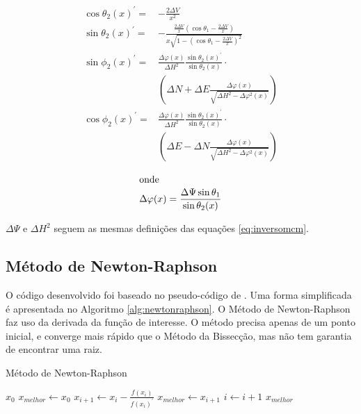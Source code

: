 \documentclass[final,5p]{elsarticle}
\numberwithin{equation}{section}
\begin{document}
    \begin{subequations}\label{eq:inversomcmprime}
    \begin{align}
        \cos \theta_2(x)^{\prime} =& - \frac{2 \Delta V}{x^2} \label{eq:costheta2prime} \\
        \sin \theta_2(x)^{\prime} =& - \frac{\frac{2 \Delta V}{x}(\cos \theta_1 - \frac{2 \Delta V}{x})}{x \sqrt{1-\left(\cos \theta_1 - \frac{2 \Delta V}{x} \right)^2}} \label{eq:sintheta2prime} \\
        \sin \phi_2(x)^{\prime} =& \frac{\Delta \varphi(x)}{\Delta H^2} \frac{\sin \theta_2(x)^{\prime}}{\sin \theta_2(x)} \cdot \nonumber \\
        &\left( \Delta N + \Delta E \frac{\Delta \varphi(x)}{\sqrt{\Delta H^2 - \Delta \varphi^2(x)}} \right) \label{eq:sinphi2prime} \\
        \cos \phi_2(x)^{\prime} =& \frac{\Delta \varphi(x)}{\Delta H^2} \frac{\sin \theta_2(x)^{\prime}}{\sin \theta_2(x)} \cdot \nonumber \\
        &\left( \Delta E - \Delta N \frac{\Delta \varphi(x)}{\sqrt{\Delta H^2 - \Delta \varphi^2(x)}} \right)   \label{eq:cosphi2prime}
    \end{align}
    \end{subequations}

    \begin{align*}
    \intertext{onde}
        \Delta \varphi(x)  = \frac{\Delta \Psi \sin \theta_1}{\sin \theta_2(x)}
    \end{align*}


    $\Delta \Psi$ e $\Delta H^2$ seguem as mesmas definições das equações \ref{eq:inversomcm}.


    \subsection{Método de Newton-Raphson}
    
    O código desenvolvido foi baseado no pseudo-código de \cite{burden2016analise}. Uma forma simplificada é apresentada no Algoritmo \ref{alg:newtonraphson}. O Método de Newton-Raphson faz uso da derivada da função de interesse. O método precisa apenas de um ponto inicial, e converge mais rápido que o Método da Bissecção, mas não tem garantia de encontrar uma raiz. 

    \begin{algorithm}
        \caption{Método de Newton-Raphson}\label{alg:newtonraphson}
        \begin{algorithmic}
            \Require $x_0$
            \State $x_{melhor} \gets x_{0}$
            \Repeat
                \State $x_{i+1} \gets x_i - \frac{f(x_i)}{f(x_i)^{\prime}}$
                    \State $x_{melhor} \gets x_{i+1}$
                \EndIf
                \State $i \gets i+1$
            \State \Return $x_{melhor}$
        \end{algorithmic}
    \end{algorithm}
\end{document}
